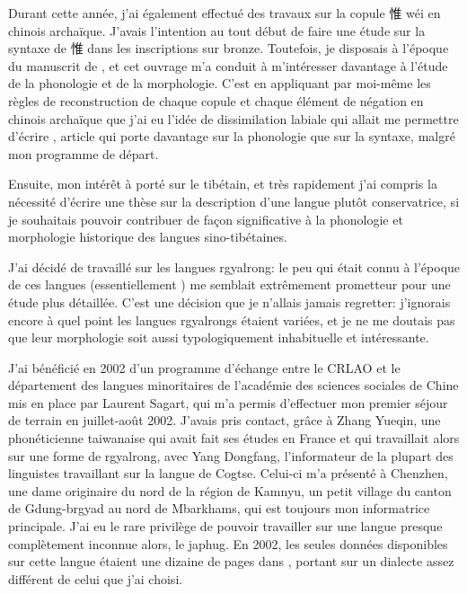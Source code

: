 \documentclass[oldfontcommands,oneside,a4paper,11pt]{memoir}
\newcommand{\zh}[1]{{\cn #1}}
\begin{document}
Durant cette année, j'ai également effectué des travaux sur la copule \zh{惟} wéi en chinois archaïque. J'avais l'intention au tout début de faire une étude sur la syntaxe de  \zh{惟} dans les inscriptions sur bronze. Toutefois, je disposais à l'époque du manuscrit de \citet{sagart99roc}, et cet ouvrage m'a conduit à m'intéresser davantage à l'étude de la phonologie et de la morphologie. C'est en appliquant par moi-même les règles de reconstruction de chaque copule et chaque élément de négation en chinois archaïque que j'ai eu l'idée de dissimilation labiale qui allait me permettre d'écrire \citet{jacques00ywij}, article qui porte davantage sur la phonologie que sur la syntaxe, malgré mon programme de départ.

Ensuite, mon intérêt à porté sur le tibétain, et très rapidement j'ai compris la nécessité d'écrire une thèse sur la description d'une langue plutôt conservatrice, si je souhaitais pouvoir contribuer de façon significative à la phonologie et morphologie historique des langues sino-tibétaines. 
 

J'ai décidé de travaillé sur les langues rgyalrong: le peu qui était connu à l'époque de ces langues (essentiellement \citet{linxr93jiarong}) me semblait extrêmement prometteur pour une étude plus détaillée. C'est une décision que je n'allais jamais regretter: j'ignorais encore à quel point les langues rgyalrongs étaient variées, et je ne me doutais pas que leur morphologie soit aussi typologiquement inhabituelle et intéressante.

J'ai bénéficié en 2002 d'un programme d'échange entre le CRLAO et le département des langues minoritaires de l'académie des sciences sociales de Chine mis en place par Laurent Sagart, qui m'a permis d'effectuer mon premier séjour de terrain en juillet-août 2002. J'avais pris contact, grâce à Zhang Yueqin, une phonéticienne taiwanaise qui avait fait ses études en France et qui travaillait alors sur une forme de rgyalrong, avec Yang Dongfang, l'informateur de la plupart des linguistes travaillant sur la langue de Cogtse. Celui-ci m'a présenté à Chenzhen, une dame originaire du nord de la région de Kamnyu, un petit village du canton de Gdung-brgyad au nord de Mbarkhams, qui est toujours mon informatrice principale. J'ai eu le rare privilège de pouvoir travailler sur une langue presque complètement inconnue alors, le japhug. En 2002, les seules données disponibles sur cette langue étaient une dizaine de pages dans \citet{linxr93jiarong}, portant sur un dialecte assez différent de celui que j'ai choisi.
\end{document}
